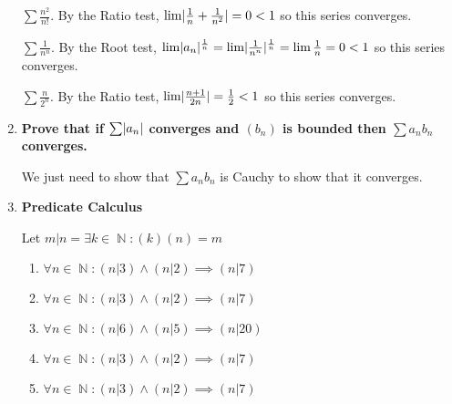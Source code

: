 \documentclass[10pt,a4paper]{article}
\DeclareMathOperator*{\N}{\mathbb{N}}
\DeclarePairedDelimiter{\abs}{\lvert}{\rvert}
\begin{document}
\begin{enumerate}
        $\sum \frac{n^2}{n!}$. By the Ratio test, $\lim \abs{\frac{1}{n} + \frac{1}{n^2}} = 0 < 1$ so this series converges.
    
        $\sum \frac{1}{n^n}$. By the Root test, $\lim \abs{a_n}^{\frac{1}{n}} = \lim \abs{\frac{1}{n^n}}^{\frac{1}{n}} = \lim \frac{1}{n} = 0 < 1$ so this series converges.

        $\sum \frac{n}{2^n}$. By the Ratio test, $\lim \abs{\frac{n+1}{2n}} = \frac{1}{2} < 1$ so this series converges.

    \item \textbf{Prove that if $\sum \abs{a_n}$ converges and $(b_n)$ is bounded then $\sum a_n b_n$ converges.}

        We just need to show that $\sum a_n b_n$ is Cauchy to show that it converges.

       
    \item \textbf{Predicate Calculus}

        Let $m\vert n = \exists k \in \N: (k)(n) = m$

        \begin{enumerate}
            \item $\forall n \in \N  : (n \vert 3 ) \land (n \vert 2) \implies (n \vert 7)$
            \item $\forall n \in \N  : (n \vert 3 ) \land (n \vert 2) \implies (n \vert 7)$
            \item $\forall n \in \N  : (n \vert 6 ) \land (n \vert 5) \implies (n \vert 20)$
            \item $\forall n \in \N  : (n \vert 3 ) \land (n \vert 2) \implies (n \vert 7)$
            \item $\forall n \in \N  : (n \vert 3 ) \land (n \vert 2) \implies (n \vert 7)$
        \end{enumerate}

\end{enumerate}
\end{document}
